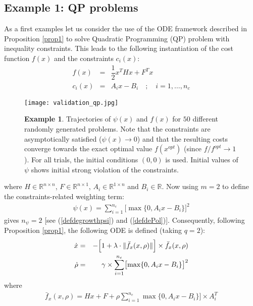 \documentclass{article}
\begin{document}
\subsection{Example 1: QP problems}
\noindent As a first examples let us consider the use of the ODE framework described in Proposition \ref{prop1} to solve Quadratic Programming (QP) problem with inequality constraints. This leads to the following instantiation of the cost function $f(x)$ and the constraints $c_i(x)$: 
\begin{eqnarray}
f(x)&=&\dfrac{1}{2}x^THx+F^Tx \label{defdeqp1} \\
c_i(x)&=&A_ix-B_i \quad ;\quad i=1,\dots,n_c \label{defdeqp2} 
\end{eqnarray}  
\begin{figure}
\begin{center}
\texttt{[image: validation\_qp.jpg]}
\end{center}
\caption{{\bf Example 1}. Trajectories of $\psi(x)$ and $f(x)$ for $50$ different randomly generated problems. Note that the constraints are asymptotically satisfied ($\psi(x)\rightarrow 0$) and that the resulting costs converge towards the exact optimal value $f(x^{opt})$ (since $f/f^{opt}\rightarrow 1$). For all trials, the initial conditions $(0,0)$ is used. Initial values of $\psi$ shows initial strong violation of the constraints.} \label{validation_qp} 
\end{figure}
where $H\in \mathbb{R}^{n\times n}$, $F\in \mathbb{R}^{n\times 1}$, $A_i\in \mathbb{R}^{1\times n}$ and $B_i\in \mathbb{R}$. Now using $m=2$ to define the constraints-related weighting term:
\begin{eqnarray}
\psi(x)=\sum_{i=1}^{n_c}\bigl[\max\{0,A_ix-B_i\}\bigr]^2
\end{eqnarray} 
gives $n_\psi=2$ [see (\ref{defdegrowthpsi}) and (\ref{defdePol})]. Consequently, following Proposition \ref{prop1}, the following ODE is defined (taking $q=2$):
\begin{eqnarray}
\dot x&=&-\Bigl[1+\lambda\cdot \|\bar f_x(x,\rho)\|\Bigr]\times \bar f_x(x,\rho) \label{odeqp1} \\
\dot \rho&=&\gamma \times \sum_{i=1}^{n_c}\bigl[\max\{0,A_ix-B_i\}\bigr]^2 \label{odeqp2} 
\end{eqnarray}  
where 
\begin{eqnarray*}
\bar f_x(x,\rho)=
Hx+F+\rho\sum_{i=1}^{n_c}\max\{0,A_ix-B_i\}]\times A_i^T
\end{eqnarray*} 
\end{document}
